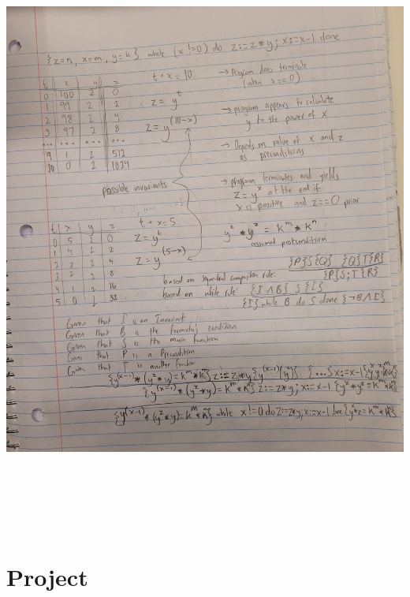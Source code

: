 \documentclass{article}
\theoremstyle{theorem}
\theoremstyle{definition}
\theoremstyle{remark}
\begin{document}
\\ \includegraphics[width=18cm, height=20cm]{Report Images/week12.jpg}

\section{Project}\label{Project}
\end{document}
